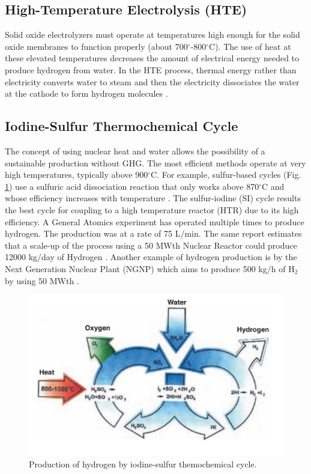 \documentclass{anstrans}
\begin{document}
\subsection{High-Temperature Electrolysis (HTE)}

Solid oxide electrolyzers must operate at temperatures high enough for the solid oxide membranes to function properly (about 700$^{\circ}$-800$^{\circ}$C). The use of heat at these elevated temperatures decreases the amount of electrical energy needed to produce hydrogen from water. In the HTE process, thermal energy rather than electricity converts water to steam and then the electricity dissociates the water at the cathode to form hydrogen molecules \cite{xu_introduction_2017}.

\subsection{Iodine-Sulfur Thermochemical Cycle}

The concept of using nuclear heat and water allows the possibility of a sustainable production without GHG. The most efficient methods operate at very high temperatures, typically above 900$^{\circ}$C. For example, sulfur-based cycles (Fig. \ref{fig:isulfur}) use a sulfuric acid dissociation reaction that only works above 870$^{\circ}$C and whose efficiency increases with temperature \cite{cea_gas-cooled_2006}. The sulfur-iodine (SI) cycle results the best cycle for coupling to a high temperature reactor (HTR) due to its high efficiency. A General Atomics experiment has operated multiple times to produce hydrogen. The production was at a rate of 75 L/min. The same report estimates that a scale-up of the process using a 50 MWth Nuclear Reactor could produce 12000 kg/day of Hydrogen \cite{benjamin_russ_sulfur_2009}.
Another example of hydrogen production is by the Next Generation Nuclear Plant (NGNP) \cite{macdonald_ngnp_2003} which aims to produce 500 kg/h of H$_2$ by using 50 MWth \cite{cea_gas-cooled_2006}.

\begin{figure}[H]
	\centering
	\includegraphics[width=0.85\linewidth]{figures/iodine-sulfur.png}
	\hfill
	\caption{Production of hydrogen by iodine-sulfur themochemical cycle.}
	\label{fig:isulfur}
\end{figure}
\end{document}
